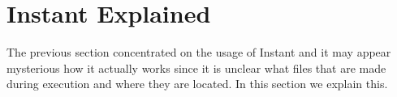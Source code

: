 %
%
%
%
%
%

\section{Instant Explained}
\label{sec:explained}

The previous section concentrated on the usage of Instant and it may
appear mysterious how it actually works since it is unclear what
files that are made during execution and where they are located. 
In this section we explain this. 

